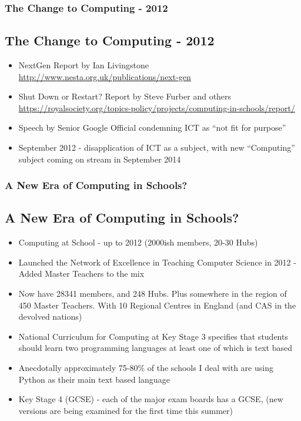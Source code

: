 \documentclass{beamer}
\begin{document}
\begin{frame}
  \frametitle{The Change to Computing - 2012}
  \subsection{The Change to Computing - 2012}

  \begin{itemize}
    \pause
  \item NextGen Report by Ian Livingstone \url{http://www.nesta.org.uk/publications/next-gen}
    \pause
  \item Shut Down or Restart? Report by Steve Furber and others
    \url{https://royalsociety.org/topics-policy/projects/computing-in-schools/report/}
    \pause
  \item Speech by Senior Google Official condemning ICT as ``not fit for purpose''
    \pause
  \item September 2012 - disapplication of ICT as a subject, with new ``Computing'' subject coming on stream in
    September 2014    
  \end{itemize}
\end{frame}

\begin{frame}
  \frametitle{A New Era of Computing in Schools?}
  \subsection{A New Era of Computing in Schools?}
  \begin{itemize}
    \pause
  \item Computing at School - up to 2012 (2000ish members, 20-30 Hubs)
    \pause
  \item Launched the Network of Excellence in Teaching Computer Science in 2012 - Added Master Teachers to the mix
    \pause
  \item Now have 28341 members, and 248 Hubs. Plus somewhere in the region of 450 Master Teachers. With 10 Regional
    Centres in England (and CAS in the devolved nations)
    \pause
  \item National Curriculum for Computing at Key Stage 3 specifies that students should learn two programming languages
    at least one of which is text based
    \pause
  \item Anecdotally approximately 75-80\% of the schools I deal with are using Python as their main text based language
    \pause
  \item Key Stage 4 (GCSE) - each of the major exam boards has a GCSE, (new versions are being examined for the first
    time this summer)
  \end{itemize}
 
\end{frame}
\end{document}
